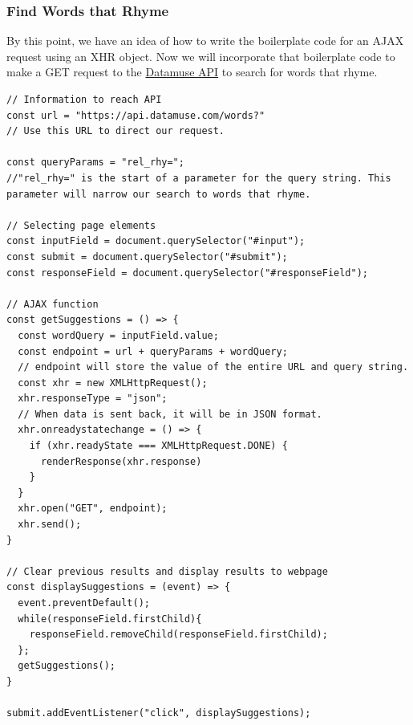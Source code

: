 \documentclass[11pt]{article}
\begin{document}
\subsubsection{Find Words that Rhyme}
By this point, we have an idea of how to write the boilerplate code for an AJAX request using an XHR object. Now we will incorporate that boilerplate code to make a GET request to the \href{https://www.datamuse.com/api/}{Datamuse API} to search for words that rhyme. 
\begin{lstlisting}
// Information to reach API
const url = "https://api.datamuse.com/words?"
// Use this URL to direct our request.

const queryParams = "rel_rhy=";
//"rel_rhy=" is the start of a parameter for the query string. This parameter will narrow our search to words that rhyme.

// Selecting page elements
const inputField = document.querySelector("#input");
const submit = document.querySelector("#submit");
const responseField = document.querySelector("#responseField");

// AJAX function
const getSuggestions = () => {
  const wordQuery = inputField.value; 
  const endpoint = url + queryParams + wordQuery; 
  // endpoint will store the value of the entire URL and query string.
  const xhr = new XMLHttpRequest(); 
  xhr.responseType = "json";
  // When data is sent back, it will be in JSON format.
  xhr.onreadystatechange = () => {
    if (xhr.readyState === XMLHttpRequest.DONE) {
      renderResponse(xhr.response)
    }
  }
  xhr.open("GET", endpoint); 
  xhr.send(); 
}

// Clear previous results and display results to webpage
const displaySuggestions = (event) => {
  event.preventDefault();
  while(responseField.firstChild){
    responseField.removeChild(responseField.firstChild);
  };
  getSuggestions();
}

submit.addEventListener("click", displaySuggestions);
\end{lstlisting}
\end{document}
